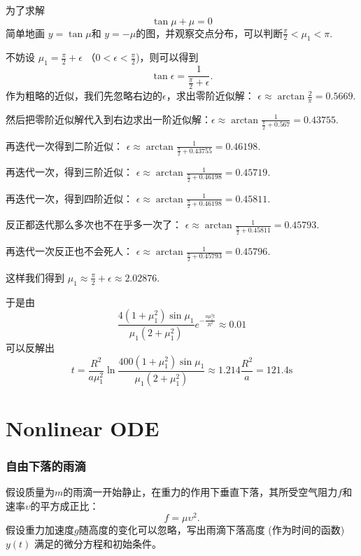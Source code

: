 \documentclass[CJK]{beamer}
\begin{document}
\begin{frame}
  为了求解
  $$\tan \mu + \mu = 0$$
  简单地画 $y=\tan \mu$和 $y=-\mu$的图，并观察交点分布，可以判断$\frac{\pi}{2}<\mu_1<\pi$.
  
  不妨设 $\mu_1 = \frac{\pi}{2}+\epsilon$ （$0<\epsilon<\frac{\pi}{2}$)，则可以得到
    $$ \tan \epsilon=\frac{1}{\frac{\pi}{2}+\epsilon}.$$
    作为粗略的近似，我们先忽略右边的$\epsilon$，求出零阶近似解： $\epsilon\approx \arctan \frac{2}{\pi} = 0.5669$.

    然后把零阶近似解代入到右边求出一阶近似解：$\epsilon\approx \arctan \frac{1}{\frac{\pi}{2}+0.567} = 0.43755 $.
\end{frame}    

\begin{frame}
    再迭代一次得到二阶近似： $\epsilon\approx \arctan \frac{1}{\frac{\pi}{2}+0.43755} = 0.46198 $.

    再迭代一次，得到三阶近似： $\epsilon\approx \arctan \frac{1}{\frac{\pi}{2}+0.46198} = 0.45719 $.

    再迭代一次，得到四阶近似： $\epsilon\approx \arctan \frac{1}{\frac{\pi}{2}+0.46198} = 0.45811 $.

    反正都迭代那么多次也不在乎多一次了： $\epsilon\approx \arctan \frac{1}{\frac{\pi}{2}+0.45811} = 0.45793 $.

    再迭代一次反正也不会死人： $\epsilon\approx \arctan \frac{1}{\frac{\pi}{2}+0.45793} = 0.45796 $.
    
    这样我们得到 $\mu_1\approx \frac{\pi}{2}+\epsilon \approx 2.02876$.
\end{frame}

\begin{frame}
  于是由
  $$ \frac{4(1+\mu_1^2) \sin\mu_1}{\mu_1(2+\mu_1^2)}  e^{-\frac{a\mu_1^2t}{R^2}} \approx 0.01 $$
  可以反解出
  $$ t = \frac{R^2}{a\mu_1^2} \ln \frac{400(1+\mu_1^2)\sin\mu_1 }{\mu_1(2+\mu_1^2)}   \approx 1.214\frac{R^2}{a}=121.4\mathrm{s}$$
\end{frame}

\section{Nonlinear ODE}

\begin{frame}
  \frametitle{自由下落的雨滴}
  假设质量为$m$的雨滴一开始静止，在重力的作用下垂直下落，其所受空气阻力$f$和速率$\upsilon$的平方成正比：
  $$ f = \mu \upsilon^2 . $$  
  假设重力加速度$g$随高度的变化可以忽略，写出雨滴下落高度 (作为时间的函数) $y(t)$ 满足的微分方程和初始条件。
\end{frame}
\end{document}
